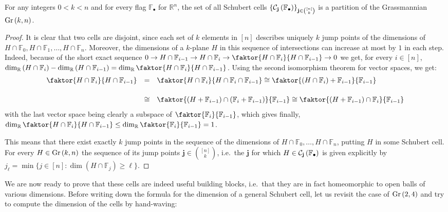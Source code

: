 \begin{lemma}\label{lem:jump_pts} For any integers $0<k<n$ and for every flag $\mathbb{F}_{\bullet}$ for $\mathbb{R}^n$, the set of all Schubert cells ${\left\{\mathcal{C}_{\mathbf{j}}\left(\mathbb{F}_{\bullet}\right)\right\}}_{\mathbf{j}\in\binom{[n]}{k}}$ is a partition of the Grassmannian $\Gr{k}{n}$.
\end{lemma}
\begin{proof} It is clear that two cells are disjoint, since each set of $k$ elements in $[n]$ describes uniquely $k$ jump points of the dimensions of $H\cap\mathbb{F}_0,H\cap\mathbb{F}_1,\ldots,H\cap\mathbb{F}_n$. Moreover, the dimensions of a $k$-plane $H$ in this sequence of intersections can increase at most by $1$ in each step. Indeed, because of the short exact sequence
$0\to H\cap\mathbb{F}_{i-1}\to H\cap\mathbb{F}_i\to\faktor{H\cap\mathbb{F}_i}{H\cap\mathbb{F}_{i-1}}\to0$
we get, for every $i\in[n]$,
$\dim_{\mathbb{R}}\left(H\cap\mathbb{F}_i\right)-\dim_{\mathbb{R}}\left(H\cap\mathbb{F}_{i-1}\right)=\dim_{\mathbb{R}}\faktor{H\cap\mathbb{F}_i}{H\cap\mathbb{F}_{i-1}}$.
Using the second isomorphism theorem for vector spaces, we get:
\[\begin{array}{>{\displaystyle}r>{\displaystyle}c>{\displaystyle}l}\faktor{H\cap\mathbb{F}_i}{H\cap\mathbb{F}_{i-1}}
&=&\faktor{H\cap\mathbb{F}_i}{H\cap\mathbb{F}_i\cap\mathbb{F}_{i-1}}\cong\faktor{(H\cap\mathbb{F}_i)+\mathbb{F}_{i-1}}{\mathbb{F}_{i-1}}\\[1.5em]
&\cong&\faktor{(H+\mathbb{F}_{i-1})\cap(\mathbb{F}_i+\mathbb{F}_{i-1})}{\mathbb{F}_{i-1}}\cong\faktor{(H+\mathbb{F}_{i-1})\cap\mathbb{F}_i}{\mathbb{F}_{i-1}}\\
\end{array}\]
with the last vector space being clearly a subspace of $\faktor{\mathbb{F}_i}{\mathbb{F}_{i-1}}$, which gives finally,
$\dim_{\mathbb{R}}\faktor{H\cap\mathbb{F}_i}{H\cap\mathbb{F}_{i-1}}\leq\dim_{\mathbb{R}}\faktor{\mathbb{F}_i}{\mathbb{F}_{i-1}}=1$.

This means that there exist exactly $k$ jump points in the sequence of the dimensions of $H\cap\mathbb{F}_0,\ldots,H\cap\mathbb{F}_n$, putting $H$ in some Schubert cell.
For every $H\in\Gr{k}{n}$ the sequence of its jump points $\mathbf{j}\in\binom{[n]}{k}$, i.e.\ the $\mathbf{j}$ for which $H\in\mathcal{C}_{\mathbf{j}}\left(\mathbb{F}_{\bullet}\right)$ is given explicitly by
$j_{\ell}=\min\{j\in[n]:\dim(H\cap\mathbb{F}_j)\geq\ell\}$.
\end{proof}

We are now ready to prove that these cells are indeed useful building blocks, i.e.\ that they are in fact homeomorphic to open balls of various dimensions. Before writing down the formula for the dimension of a general Schubert cell, let us revisit the case of $\Gr{2}{4}$ and try to compute the dimension of the cells by hand-waving:

